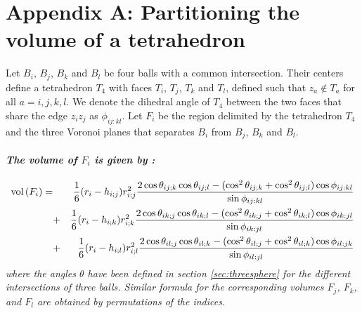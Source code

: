 \documentclass[11 pt]{article}
\newcommand {\mm}[1] {\ifmmode{#1}\else{\mbox{\(#1\)}}\fi}
\theoremstyle{plain} \theorembodyfont{\rmfamily}
\newcommand{\Volume}[1]     {\mm{\rm vol\,}{#1}}
\begin{document}

{\footnotesize

}
\newpage

\appendix


\renewcommand{\theequation}{A.\arabic{equation}} 
\renewcommand{\thefigure}{A.\arabic{figure}} 
 \setcounter{equation}{0} 
  \setcounter{figure}{0} 
 

\section*{Appendix A: Partitioning the volume of a tetrahedron}

Let $B_i$, $B_j$, $B_k$ and $B_l$ be four balls with a common intersection.  Their centers define a tetrahedron $T_4$ with faces $T_i$, $T_j$, $T_k$ and $T_l$, defined such that $z_a \notin T_a$ for all $a =i,j,k,l$. 
We denote the dihedral angle of $T_4$ between the two faces that share the edge $z_i z_j$ as $\phi_{ij:kl}$. Let $F_i$ be the region delimited by the tetrahedron $T_4$ and
 the three Voronoi planes that separates $B_i$ from $B_j$, $B_k$ and $B_l$.
 
\paragraph{\emph{The volume of $F_i$ is given by :}}
\begin{eqnarray}
\Volume{(F_i)} = && \frac{1}{6}(r_i - h_{i;j})r_{i;j}^2 \frac{2\cos{\theta_{ij;k}}\cos{\theta_{ij;l}}-(\cos^2{\theta_{ij;k}}
+\cos^2{\theta_{ij;l})} \cos{\phi_{ij:kl}}}{\sin{\phi_{ij:kl}}} \nonumber \\
&+& \frac{1}{6}(r_i - h_{i;k})r_{i;k}^2 \frac{2\cos{\theta_{ik;j}}\cos{\theta_{ik;l}}-(\cos^2{\theta_{ik;j}}
+\cos^2{\theta_{ik;l})} \cos{\phi_{ik:jl}}}{\sin{\phi_{ik:jl}}} \nonumber \\
&+&\frac{1}{6}(r_i - h_{i;l})r_{i;l}^2 \frac{2\cos{\theta_{il;j}}\cos{\theta_{il;k}}-(\cos^2{\theta_{il;j}}
+\cos^2{\theta_{il;k}}) \cos{\phi_{il:jk}}}{\sin{\phi_{il:jl}}}
\label{eqn:volFi}
\end{eqnarray}
\emph{where the angles $\theta$ have been defined in section \ref{sec:threesphere} for the different intersections of three balls. Similar formula for the corresponding volumes $F_j$, $F_k$, and $F_l$ are obtained by permutations of the indices.}
\end{document}
